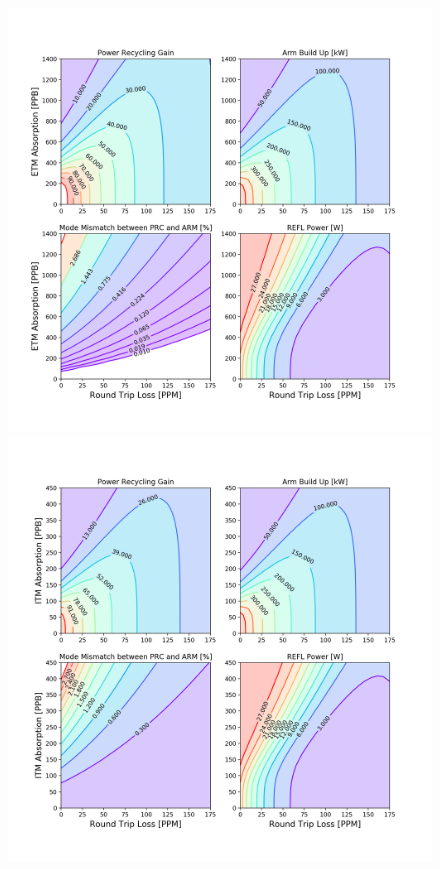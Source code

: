 	\begin{figure}
		\centering
		\begin{minipage}{0.5\textheight}
			\centering
			\includegraphics[height=0.5 \textheight]{../Figures/Simplified_PRC_ARM_etm_abs.png}
		\end{minipage}\hfill
		\begin{minipage}{0.5\textheight}
			\centering
			\includegraphics[height=0.5 \textheight]{../Figures/Simplified_PRC_ARM_itm_abs.png}

\end{minipage}
\end{figure}
